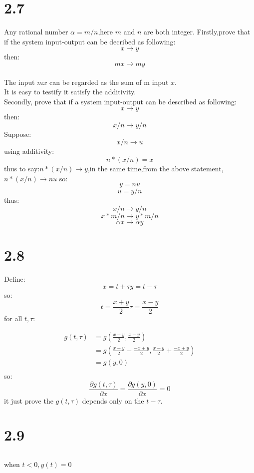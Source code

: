 \documentclass{article}
\newcommand{\rmnum}[1]{\romannumeral #1}
\begin{document}
\section*{2.7}
Any rational number $\alpha=m/n$,here $m$ and $n$ are both integer.
Firstly,prove that if the system input-output can be decribed as following:
\[x\rightarrow y\]
then:
\[mx\rightarrow my\]\\
The input $mx$ can be regarded as the sum of m input $x$.\\
It is easy to testify it satisfy the additivity.\\
Secondly, prove that if a system input-output can be described as following:
\[x \rightarrow y\]
then:
\[x/n \rightarrow y/n\]
Suppose:%
\[x/n\rightarrow u\]
using additivity:
\[n*(x/n)=x\]
thus to say:$n*(x/n)\rightarrow y$,in the same time,from the above statement,$n*(x/n)\rightarrow nu$
so:
\[y=nu\]
\[u=y/n\]
thus:
\[x/n\rightarrow y/n\]
\[x*m/n \rightarrow y*m/n \]
\[\alpha x\rightarrow \alpha y\]

\section*{2.8}
Define:
\[x=t+\tau y=t-\tau\]
so:
\[t=\frac{x+y}{2} \tau=\frac{x-y}{2}\]
for all $t,\tau$:

\[
\begin{aligned}
g(t,\tau)&=g(\frac{x+y}{2},\frac{x-y}{2})\\
&=g(\frac{x+y}{2}+\frac{-x+y}{2},\frac{x-y}{2}+\frac{-x+y}{2})\\
&=g(y,0)\\   
\end{aligned}\]
so:
\[\frac{\partial g(t,\tau)}{\partial x}=\frac{\partial g(y,0)}{\partial x}=0\]
it just prove the $g(t,\tau)$ depends only on the $t-\tau.$

\section*{2.9}
\subsection*{\rmnum{1}}when $t<0,y(t)=0$\\
\end{document}
